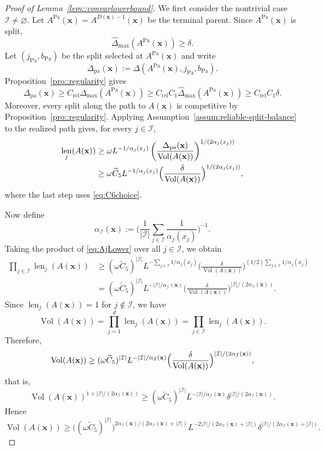 \documentclass[11pt]{article}
\theoremstyle{plain}
\theoremstyle{definition}
\theoremstyle{remark}
\theoremstyle{plain}
\newcommand{\bx}{\mathbf{x}}
\DeclareMathOperator{\Vol}{Vol}
\DeclareMathOperator{\len}{len}
\newcommand{\1}{\mathbbm{1}}
\begin{document}
\begin{proof}[Proof of Lemma~\ref{lem::convarlowerbound}]
We first consider the nontrivial case $\mathcal I\neq\varnothing$.
Let $A^{\mathrm{Pa}}(\bx)=A^{D(\bx)-1}(\bx)$ be the terminal parent. Since $A^{\mathrm{Pa}}(\bx)$ is split,
\[
\widehat\Delta_{\max}(A^{\mathrm{Pa}}(\bx))\ge\delta.
\]
Let $(j_{\mathrm{Pa}},b_{\mathrm{Pa}})$ be the split selected at $A^{\mathrm{Pa}}(\bx)$ and write
\[
\Delta_{\mathrm{pa}}(\bx)
:=
\Delta(A^{\mathrm{Pa}}(\bx),j_{\mathrm{Pa}},b_{\mathrm{Pa}}).
\]
Proposition~\ref{pro::regularity} gives
\[
\Delta_{\mathrm{pa}}(\bx)
\ge
C_{\mathrm{rel}}\Delta_{\max}(A^{\mathrm{Pa}}(\bx))
\ge
C_{\mathrm{rel}}C_1\widehat\Delta_{\max}(A^{\mathrm{Pa}}(\bx))
\ge C_{\mathrm{rel}}C_1\delta.
\]
Moreover, every split along the path to $A(\bx)$ is competitive by Proposition~\ref{pro::regularity}. Applying Assumption~\ref{assum:reliable-split-balance} to the realized path gives, for every $j\in\mathcal I$,
\begin{align}
\label{eq:AjLower}
\len_j(A(\bx))
&\ge
\omega
L^{-1/\alpha_j(x_j)}
\left(
\frac{\Delta_{\mathrm{pa}}(\bx)}{\Vol(A(\bx))}
\right)^{1/(2\alpha_j(x_j))} \notag\\
	&\ge
	\omega\widetilde C_5L^{-1/\alpha_j(x_j)}
	\Bigl(\frac{\delta}{\Vol(A(\bx))}\Bigr)^{1/(2\alpha_j(x_j))} ,
	\end{align}
	where the last step uses \eqref{eq:C6choice}.

Now define
\[
\alpha_{\mathcal I}(\bx)
:=
\Biggl(
\frac{1}{|\mathcal I|}
\sum_{j\in\mathcal I}\frac{1}{\alpha_j(x_j)}
\Biggr)^{-1}.
\]
Taking the product of \eqref{eq:AjLower} over all $j\in\mathcal I$, we obtain
\begin{align*}
\prod_{j\in\mathcal I}\len_j(A(\bx))
&\ge
(\omega\widetilde C_5)^{|\mathcal I|}
L^{-\sum_{j\in\mathcal I}1/\alpha_j(x_j)}
\biggl(\frac{\delta}{\Vol(A(\bx))}\biggr)^{
(1/2)\sum_{j\in\mathcal I}1/\alpha_j(x_j)
} \\
&=
(\omega\widetilde C_5)^{|\mathcal I|}
L^{-|\mathcal I|/\alpha_{\mathcal I}(\bx)}
\biggl(\frac{\delta}{\Vol(A(\bx))}\biggr)^{
|\mathcal I|/(2\alpha_{\mathcal I}(\bx))
}.
\end{align*}
Since $\len_j(A(\bx))=1$ for $j\notin\mathcal I$, we have
\[
\Vol(A(\bx))
=
\prod_{j=1}^d \len_j(A(\bx))
=
\prod_{j\in\mathcal I}\len_j(A(\bx)).
\]
Therefore,
\[
	\Vol(A(\bx))
	\ge
	(\omega\widetilde C_5)^{|\mathcal I|}
	L^{-|\mathcal I|/\alpha_{\mathcal I}(\bx)}
	\Bigl(\frac{\delta}{\Vol(A(\bx))}\Bigr)^{
	|\mathcal I|/(2\alpha_{\mathcal I}(\bx))
},
\]
that is,
\[
	\Vol(A(\bx))^{1+|\mathcal I|/(2\alpha_{\mathcal I}(\bx))}
	\ge
	(\omega\widetilde C_5)^{|\mathcal I|}
	L^{-|\mathcal I|/\alpha_{\mathcal I}(\bx)}
	\delta^{|\mathcal I|/(2\alpha_{\mathcal I}(\bx))}.
\]
Hence
\begin{equation}\label{eq:AlowerI}
	\Vol(A(\bx))
	\ge
	\bigl((\omega\widetilde C_5)^{|\mathcal I|}\bigr)^{
	2\alpha_{\mathcal I}(\bx)/(2\alpha_{\mathcal I}(\bx)+|\mathcal I|)
	}
L^{-2|\mathcal I|/(2\alpha_{\mathcal I}(\bx)+|\mathcal I|)}
\delta^{|\mathcal I|/(2\alpha_{\mathcal I}(\bx)+|\mathcal I|)}.
\end{equation}


\end{proof}
\end{document}
